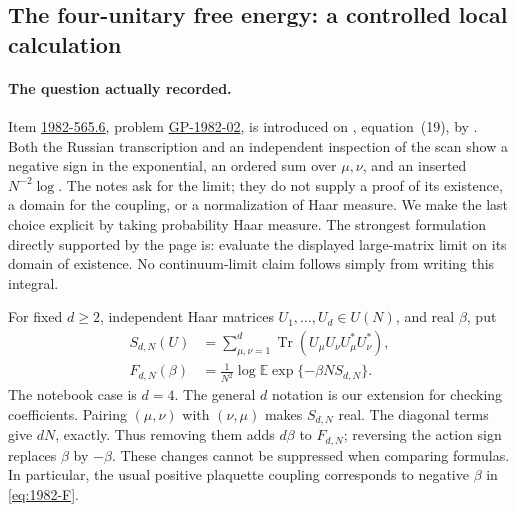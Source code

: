 \subsection{The four-unitary free energy: a controlled local calculation}
\label{dev:1982-migdal}

\paragraph{The question actually recorded.}
Item \hyperref[item:1982-565.6]{1982-565.6}, problem
\hyperref[prob:GP-1982-02]{GP-1982-02}, is introduced on
, equation~(19), by .
Both the Russian transcription and an independent inspection of the scan show
a negative sign in the exponential, an ordered sum over \(\mu,\nu\), and an
inserted \(N^{-2}\log\). The notes ask for the limit; they do not supply a
proof of its existence, a domain for the coupling, or a normalization of Haar
measure. We make the last choice explicit by taking probability Haar measure.
The strongest formulation directly supported by the page is: evaluate the
displayed large-matrix limit on its domain of existence. No continuum-limit
claim follows simply from writing this integral.

For fixed \(d\geq2\), independent Haar matrices \(U_1,\ldots,U_d\in U(N)\),
and real \(\beta\), put
\begin{align}
 S_{d,N}(U)&=\sum_{\mu,\nu=1}^{d}
       \operatorname{Tr}(U_\mu U_\nu U_\mu^*U_\nu^*),\label{eq:1982-S}\\
 F_{d,N}(\beta)&=\frac1{N^2}\log
       \mathbb E\exp\{-\beta N S_{d,N}\}.\label{eq:1982-F}
\end{align}
The notebook case is \(d=4\). The general \(d\) notation is our extension
for checking coefficients. Pairing \((\mu,\nu)\) with \((\nu,\mu)\) makes
\(S_{d,N}\) real. The diagonal terms give \(dN\), exactly. Thus removing
them adds \(d\beta\) to \(F_{d,N}\); reversing the action sign replaces
\(\beta\) by \(-\beta\). These changes cannot be suppressed when comparing
formulas. In particular, the usual positive plaquette coupling corresponds
to negative \(\beta\) in \eqref{eq:1982-F}.

